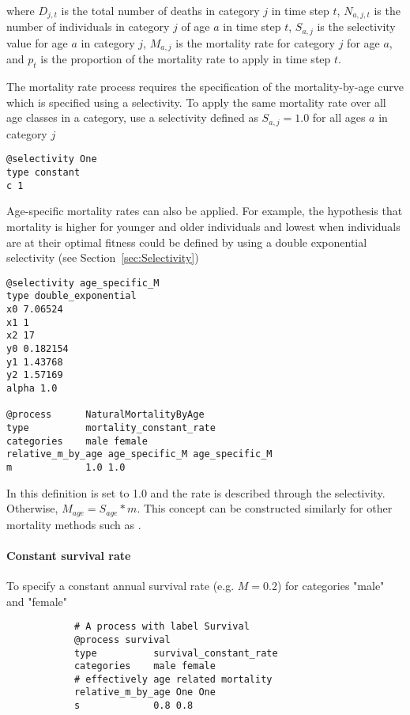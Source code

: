 where $D_{j,t}$ is the total number of deaths in category $j$ in time step $t$, $N_{a,j,t}$ is the number of individuals in category $j$ of age $a$ in time step $t$, $S_{a,j}$ is the selectivity value for age $a$ in category $j$, $M_{a,j}$ is the mortality rate for category $j$ for age $a$, and $p_t$ is the proportion of the mortality rate to apply in time step $t$.

The mortality rate process requires the specification of the mortality-by-age curve which is specified using a selectivity. To apply the same mortality rate over all age classes in a category, use a selectivity defined as $S_{a,j}=1.0$ for all ages $a$ in category $j$

{\small{\begin{verbatim}
@selectivity One
type constant
c 1
\end{verbatim}}}

Age-specific mortality rates can also be applied. For example, the hypothesis that mortality is higher for younger and older individuals and lowest when individuals are at their optimal fitness could be defined by using a double exponential selectivity (see Section~\ref{sec:Selectivity})

{\small{\begin{verbatim}
@selectivity age_specific_M
type double_exponential
x0 7.06524
x1 1
x2 17
y0 0.182154
y1 1.43768
y2 1.57169
alpha 1.0

@process      NaturalMortalityByAge
type          mortality_constant_rate
categories    male female
relative_m_by_age age_specific_M age_specific_M
m             1.0 1.0
\end{verbatim}}}


In this definition  is set to 1.0 and the rate is described through the selectivity. Otherwise, $M_{age} = S_{age} * m$. This concept can be constructed similarly for other mortality methods such as .

\paragraph{Constant survival rate}\label{sec:Process-SurvivalConstantRate} 

To specify a constant annual survival rate (e.g. $M=0.2$) for categories "male" and "female"

{\small{\begin{verbatim}
			# A process with label Survival
			@process survival
			type          survival_constant_rate
			categories    male female
			# effectively age related mortality
			relative_m_by_age One One
			s             0.8 0.8
\end{verbatim}}}

